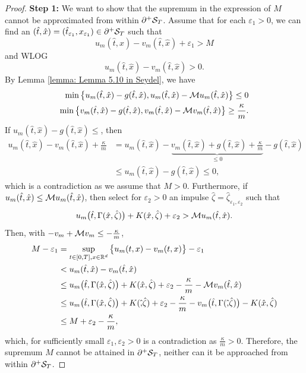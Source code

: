 \begin{proof}
    \textbf{Step 1:} We want to show that the supremum in the expression of $M$ cannot be approximated from within $\partial^+\mathcal{S}_T$. Assume that for each $\varepsilon_1 > 0$, we can find an $(\hat t,\hat x) = (\hat t_{\varepsilon_1},x_{\varepsilon_1}) \in \partial^+\mathcal{S}_T$ such that 
    \begin{equation*}
        u_m(\hat t,\hat x) - v_m(\hat t,\hat x) + \varepsilon_1 > M
    \end{equation*}
    and WLOG 
    \begin{equation*}
        u_m(\hat t,\hat x) - v_m(\hat t,\hat x) > 0.
    \end{equation*}
    By Lemma \ref{lemma: Lemma 5.10 in Seydel}, we have 
    \begin{align*}
        \min \big\{ u_m(\hat t,\hat x) - g(\hat t,\hat x), u_m(\hat t,\hat x) - \mathcal{M} u_m(\hat t,\hat x) \big\} \leq 0 \\
        \min \big\{ v_m(\hat t,\hat x) - g(\hat t,\hat x), v_m(\hat t,\hat x) - \mathcal{M} v_m(\hat t,\hat x) \big\} \geq \frac{\kappa}{m}.
    \end{align*}
    If $u_m(\hat t,\hat x) - g(\hat t,\hat x) \leq$, then
    \begin{align*}
        u_m(\hat t,\hat x) - v_m(\hat t,\hat x) + \frac \kappa m &= u_m(\hat t,\hat x) - \underbrace{v_m(\hat t,\hat x) + g(\hat t,\hat x) + \frac \kappa m}_{\leq 0} - g(\hat t,\hat x) \\
        & \leq u_m(\hat t,\hat x) - g(\hat t,\hat x) \leq 0,
    \end{align*}
    which is a contradiction as we assume that $M>0$. Furthermore, if $u_m(\hat t,\hat x) \leq \mathcal{M} u_m(\hat t,\hat x)$, then select for $\varepsilon_2>0$ an impulse $\hat \zeta = \hat \zeta_{\varepsilon_1,\varepsilon_2}$ such that
    \begin{equation*}
        u_m\big(\hat t, \Gamma(\hat x, \hat \zeta) \big) + K(\hat x, \hat \zeta) + \varepsilon_2 > \mathcal{M} u_m(\hat t, \hat x).
    \end{equation*}
    Then, with $-v_m + \mathcal{M} v_m \leq -\frac{\kappa}{m}$,
    \begin{align*}
        M - \varepsilon_1 &= \sup_{t \in [0,T], x \in \mathbb{R}^d} \big\{u_m(t,x) - v_m(t,x) \big\} - \varepsilon_1 \\
        &< u_m(\hat t,\hat x) - v_m(\hat t,\hat x) \\
        &\leq u_m \big(\hat t, \Gamma(\hat x, \hat \zeta)\big) + K(\hat x, \hat \zeta) + \varepsilon_2 - \frac \kappa m - \mathcal{M} v_m(\hat t, \hat x) \\
        & \leq u_m \big(\hat t, \Gamma(\hat x, \hat \zeta)\big) + K(\hat, \hat \zeta) + \varepsilon_2 - \frac{\kappa}{m} - v_m\big(\hat t, \Gamma(\hat, \hat \zeta) \big) - K(\hat x, \hat \zeta) \\
        & \leq M + \varepsilon_2 - \frac{\kappa}{m},
    \end{align*}
    which, for sufficiently small $\varepsilon_1, \varepsilon_2>0$ is a contradiction as $\frac{\kappa}{m}>0$. Therefore, the supremum $M$ cannot be attained in $\partial^+ \mathcal{S}_T$, neither can it be approached from within $\partial^+ \mathcal{S}_T$. 


\end{proof}
